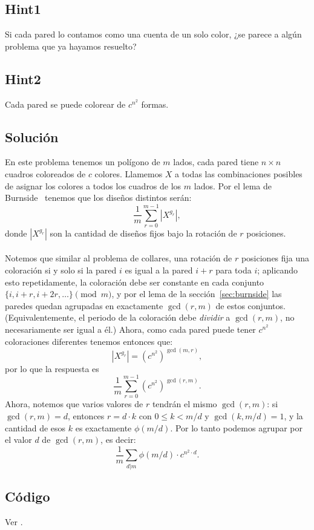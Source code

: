 \subsection*{Hint1}
Si cada pared lo contamos como una cuenta de un solo color, ¿se parece a algún problema que ya hayamos resuelto?
\subsection*{Hint2}
Cada pared se puede colorear de $c^{n^2}$ formas.
\subsection*{Solución}
En este problema tenemos un polígono de $m$ lados, cada pared tiene $n\times n$ cuadros coloreados de $c$ colores. Llamemos $X$ a todas las combinaciones posibles de asignar los colores a todos los cuadros de los $m$ lados. Por el lema de Burnside~\cite{cf_burnside} tenemos que los diseños distintos serán:
\[\frac{1}{m} \sum_{r=0}^{m-1}|X^{g_r}|,\]
donde $|X^{g_r}|$ son la cantidad de diseños fijos bajo la rotación de $r$ posiciones.
\\\\Notemos que similar al problema de collares, una rotación de $r$ posiciones fija una coloración si y solo si la pared $i$ es igual a la pared $i+r$ para toda $i$; aplicando esto repetidamente, la coloración debe ser constante en cada conjunto $\{i, i+r, i+2r, \dots\} \pmod m$, y por el lema de la sección~\ref{sec:burnside} las paredes quedan agrupadas en exactamente $\gcd(r,m)$ de estos conjuntos. (Equivalentemente, el periodo de la coloración debe \emph{dividir} a $\gcd(r,m)$, no necesariamente ser igual a él.) Ahora, como cada pared puede tener $c^{n^2}$ coloraciones diferentes tenemos entonces que:
\[|X^{g_r}|=(c^{n^2})^{\gcd(m,r)},\]
por lo que la respuesta es
\[\frac{1}{m}\sum_{r=0}^{m-1}(c^{n^2})^{\gcd(r,m)}.\]
Ahora, notemos que varios valores de $r$ tendrán el mismo $\gcd(r,m)$: si $\gcd(r,m)=d$, entonces $r=d\cdot k$ con $0 \le k <m/d$ y $\gcd(k,m/d)=1$, y la cantidad de esos $k$ es exactamente $\phi(m/d)$. Por lo tanto podemos agrupar por el valor $d$ de $\gcd(r,m)$, es decir:
\[\frac{1}{m}\sum_{d|m}\phi(m/d)\cdot c^{n^2 \cdot d}.\]
\subsection*{Código}
Ver .

